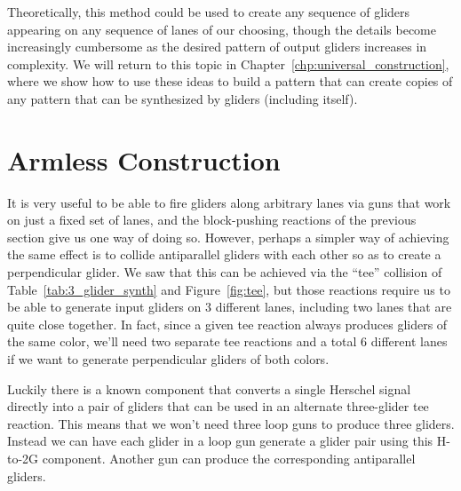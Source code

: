 Theoretically, this method could be used to create any sequence of gliders appearing on any sequence of lanes of our choosing, though the details become increasingly cumbersome as the desired pattern of output gliders increases in complexity. We will return to this topic in Chapter~\ref{chp:universal_construction}, where we show how to use these ideas to build a pattern that can create copies of any pattern that can be synthesized by gliders (including itself).



\section{Armless Construction}\label{sec:armless}

It is very useful to be able to fire gliders along arbitrary lanes via guns that work on just a fixed set of lanes, and the block-pushing reactions of the previous section give us one way of doing so. However, perhaps a simpler way of achieving the same effect is to collide antiparallel gliders with each other so as to create a perpendicular glider. We saw that this can be achieved via the ``tee'' collision of Table~\ref{tab:3_glider_synth} and Figure~\ref{fig:tee}, but those reactions require us to be able to generate input gliders on $3$ different lanes, including two lanes that are quite close together. In fact, since a given tee reaction always produces gliders of the same color, we'll need two separate tee reactions and a total $6$ different lanes if we want to generate perpendicular gliders of both colors.

Luckily there is a known component that converts a single Herschel signal directly into a pair of gliders that can be used in an alternate three-glider tee reaction. This means that we won't need three loop guns to produce three gliders.  Instead we can have each glider in a loop gun generate a glider pair using this H-to-2G component. Another gun can produce the corresponding antiparallel gliders.



